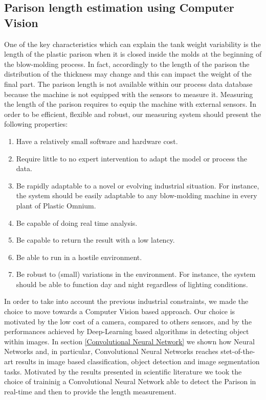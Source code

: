 \subsection{Parison length estimation using Computer Vision}

One of the key characteristics which can explain the tank weight variability is the length of the plastic parison when it is closed inside the molds at the beginning of the blow-molding process. In fact, accordingly to the length of the parison the distribution of the thickness may change and this can impact the weight of the final part. The parison length is not available within our process data database because the machine is not equipped with the sensors to measure it. Measuring the length of the parison requires to equip the machine with external sensors. In order to be efficient, flexible and robust, our measuring system should present the following properties:
%
\begin{enumerate}
    \item Have a relatively small software and hardware cost.
    \item Require little to no expert intervention to adapt the model or process the data.
    \item Be rapidly adaptable to a novel or evolving industrial situation. For instance, the system should be easily adaptable to any blow-molding machine in every plant of Plastic Omnium.
    \item Be capable of doing real time analysis.
    \item Be capable to return the result with a low latency.
    \item Be able to run in a hostile environment. 
    \item Be robust to (small) variations in the environment. For instance, the system should be able to function day and night regardless of lighting conditions.
\end{enumerate}
%
In order to take into account the previous industrial constraints, we made the choice to move towards a Computer Vision based approach. Our choice is motivated by the low cost of a camera, compared to others sensors, and by the performances achieved by Deep-Learning based algorithms in detecting object within images. In section \ref{Convolutional Neural Network} we shown how Neural Networks and, in particular, Convolutional Neural Networks reaches stet-of-the-art results in image based classification, object detection and image segmentation tasks. Motivated by the results presented in scientific literature we took the choice of traininig a Convolutional Neural Network able to detect the Parison in real-time and then to provide the length measurement.
